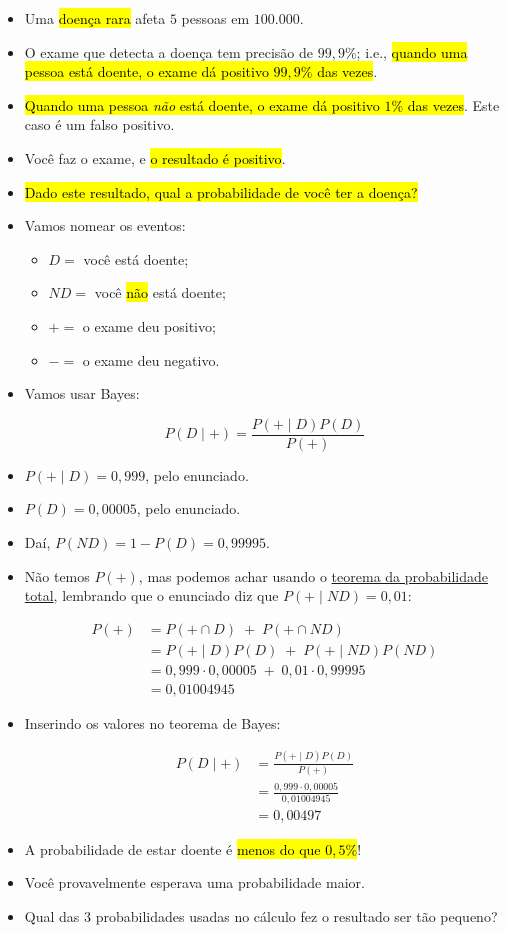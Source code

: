 \documentclass[
  11pt]{report}
\begin{document}
\begin{itemize}
\item
  Uma {\hl{doença rara}} afeta $5$ pessoas em $100.000$.
\item
  O exame que detecta a doença tem precisão de $99{,}9\%$; i.e., {\hl{quando uma pessoa está doente, o exame dá positivo $99{,}9\%$ das vezes}}.
\item
  {\hl{Quando uma pessoa \emph{não} está doente, o exame dá positivo $1\%$ das vezes}}. Este caso é um falso positivo.
\item
  Você faz o exame, e {\hl{o resultado é positivo}}.
\item
  {\hl{Dado este resultado, qual a probabilidade de você ter a doença?}}
\item
  Vamos nomear os eventos:

  \begin{itemize}
  \item
    $D = {}$ você está doente;
  \item
    $ND = {}$ você {\hl{não}} está doente;
  \item
    $+ = {}$ o exame deu positivo;
  \item
    $- = {}$ o exame deu negativo.
  \end{itemize}
\item
  Vamos usar Bayes:

  \[
  P(D \mid +) = \frac{P(+ \mid D)P(D)}{P(+)}
  \]
\item
  $P(+ \mid D) = 0{,}999$, pelo enunciado.
\item
  $P(D) = 0{,}00005$, pelo enunciado.
\item
  Daí, $P(ND) = 1 - P(D) = 0{,}99995$.
\item
  Não temos $P(+)$, mas podemos achar usando o \protect\hyperlink{probabilidade-total}{teorema da probabilidade total}, lembrando que o enunciado diz que $P(+ \mid ND) = 0{,}01$:

  \[
  \begin{aligned}
  P(+) &= P(+ \cap D) \;+\; P(+ \cap ND) \\
     &= P(+ \mid D)P(D) \;+\; P(+ \mid ND)P(ND) \\
     &= 0{,}999 \cdot 0{,}00005 \;+\; 0{,}01 \cdot 0{,}99995 \\
     &= 0{,}01004945
  \end{aligned}
  \]
\item
  Inserindo os valores no teorema de Bayes:

  \[
  \begin{aligned}
    P(D \mid +) &= \frac{P(+ \mid D)P(D)}{P(+)} \\
                &= \frac{0{,}999 \cdot 0{,}00005}{0{,}01004945} \\
                &= 0{,}00497
  \end{aligned}
  \]
\item
  A probabilidade de estar doente é {\hl{menos do que $0{,}5\%$}}!
\item
  Você provavelmente esperava uma probabilidade maior.
\item
  Qual das $3$ probabilidades usadas no cálculo fez o resultado ser tão pequeno?


\end{itemize}
\end{document}

